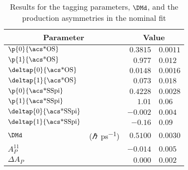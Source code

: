 \begin{table}[h]
  \caption{Results for the tagging parameters, $\DMd$, and the production
  asymmetries in the nominal fit}
  \label{tab:measurement_of_sin2beta:cpv_measurement:results:tagging}
  \centering
  \begin{tabular}{llr@{$\,\pm\,$}l}
      \toprule
      \multicolumn{2}{c}{Parameter}         & \multicolumn{2}{c}{Value}                 \\
      \midrule
      $\p{0}{\text{\acs*{OS}}}$        &                          & $0.3815$  & $0.0011$  \\
      $\p{1}{\text{\acs*{OS}}}$        &                          & $0.977$   & $0.012$   \\
      $\deltap{0}{\text{\acs*{OS}}}$   &                          & $0.0148$  & $0.0016$  \\
      $\deltap{1}{\text{\acs*{OS}}}$   &                          & $0.073$   & $0.018$   \\
      $\p{0}{\text{\acs*{SSpi}}}$      &                          & $0.4228$  & $0.0028$  \\
      $\p{1}{\text{\acs*{SSpi}}}$      &                          & $1.01$    & $0.06$    \\
      $\deltap{0}{\text{\acs*{SSpi}}}$ &                          & $-0.002$  & $0.004$   \\
      $\deltap{1}{\text{\acs*{SSpi}}}$ &                          & $-0.16$   & $0.09$    \\
      $\DMd$                    & (\si{\planckbar\per\pico\second})    & $0.5100$  & $0.0030$  \\
      $A_P^{11}$                &                          & $-0.014$  & $0.005$   \\
      $\Delta A_P$              &                          & $0.000$   & $0.002$   \\
      \bottomrule
    \end{tabular}
\end{table}
%
